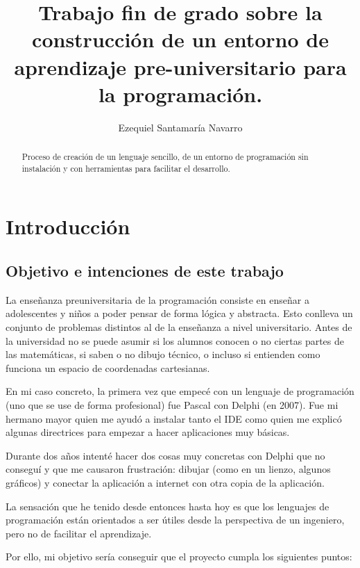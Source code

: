 \documentclass{report}
\author{Ezequiel Santamaría Navarro}
\title{Trabajo fin de grado sobre la construcción de un entorno de aprendizaje pre-universitario para la programación.}
\begin{document}
	\maketitle
	\tableofcontents
	
	\begin{abstract}
		Proceso de creación de un lenguaje sencillo, de un entorno de programación sin instalación y con herramientas para facilitar el desarrollo.
	\end{abstract}
	
	
	\chapter{Introducción}
	
	\section{Objetivo e intenciones de este trabajo}
	
	La enseñanza preuniversitaria de la programación consiste en enseñar a adolescentes y niños a poder pensar de forma lógica y abstracta. Esto conlleva un conjunto de problemas distintos al de la enseñanza a nivel universitario. Antes de la universidad no se puede asumir si los alumnos conocen o no ciertas partes de las matemáticas, si saben o no dibujo técnico, o incluso si entienden como funciona un espacio de coordenadas cartesianas.
	
	En mi caso concreto, la primera vez que empecé con un lenguaje de programación (uno que se use de forma profesional) fue Pascal con Delphi (en 2007). Fue mi hermano mayor quien me ayudó a instalar tanto el IDE como quien me explicó algunas directrices para empezar a hacer aplicaciones muy básicas.
	
	Durante dos años intenté hacer dos cosas muy concretas con Delphi que no conseguí y que me causaron frustración: dibujar (como en un lienzo, algunos gráficos) y conectar la aplicación a internet con otra copia de la aplicación.
	
	La sensación que he tenido desde entonces hasta hoy es que los lenguajes de programación están orientados a ser útiles desde la perspectiva de un ingeniero, pero no de facilitar el aprendizaje. 
	
	Por ello, mi objetivo sería conseguir que el proyecto cumpla los siguientes puntos:
	
\end{document}

